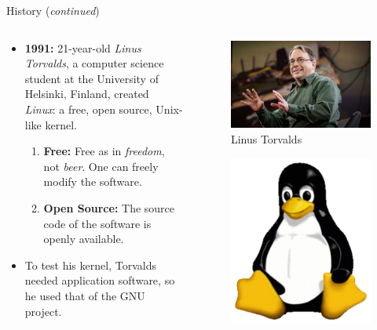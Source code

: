 \documentclass[11pt]{beamer}
\begin{document}
\begin{frame}{History (\textit{continued})}
	\begin{columns}
		\begin{column}{0.5\textwidth}
			\begin{itemize}
				\item \textbf{1991:} 21-year-old \textit{Linus Torvalds}, a computer science student at the University of Helsinki, Finland, created \textit{Linux}: a free, open source, Unix-like kernel.
				\begin{enumerate}
					\item \textbf{Free:} Free as in \textit{freedom}, not \textit{beer}. One can freely modify the software.
					\item \textbf{Open Source:} The source code of the software is openly available.
				\end{enumerate}
				\item To test his kernel, Torvalds needed application software, so he used that of the GNU project.
			\end{itemize}
		\end{column}
		\begin{column}{0.5\textwidth}
			\vspace{-10mm}
			\begin{figure}
				\includegraphics[scale=0.05]{torvalds.jpg}
				\caption{Linus Torvalds}
			\end{figure}
			\vspace{-7mm}
			\begin{figure}
				\includegraphics[scale=0.25]{tux.png}

\end{figure}
\end{column}
\end{columns}
\end{frame}
\end{document}
